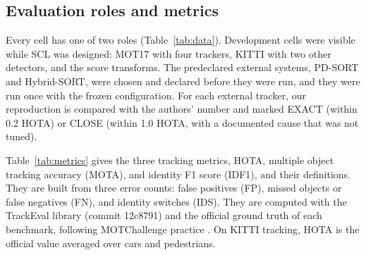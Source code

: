 \documentclass[pdflatex,referee,sn-mathphys-num]{sn-jnl}
\newcommand{\scl}{SCL}
\begin{document}
\subsection{Evaluation roles and metrics}\label{sec:roles}
Every cell has one of two roles (Table~\ref{tab:data}). Development cells
were visible while \scl{} was designed: MOT17 with four trackers, KITTI with
two other detectors, and the score transforms. The predeclared external systems,
PD-SORT and Hybrid-SORT, were chosen and declared before they were run, and
they were run once with the frozen configuration. For each external tracker,
our reproduction is compared with the authors' number and marked EXACT
(within 0.2 HOTA) or CLOSE (within 1.0 HOTA, with a documented cause that was
not tuned).

\label{sec:metrics}Table~\ref{tab:metrics} gives the three tracking metrics,
HOTA, multiple object tracking accuracy (MOTA), and identity F1 score (IDF1),
and their definitions. They are built from three error counts: false
positives (FP), missed objects or false negatives (FN), and identity switches
(IDS). They are computed with the TrackEval library (commit
12c8791) and the official ground truth of each benchmark, following
MOTChallenge practice \cite{dendorfer2021motchallenge}. On KITTI tracking,
HOTA is the official value averaged over cars and pedestrians.
\end{document}
